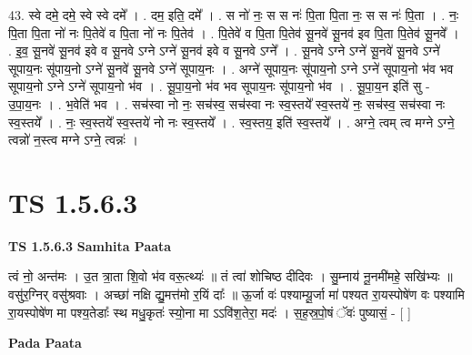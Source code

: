 \documentclass[17pt]{extarticle}
\begin{document}
43. स्वे दमे॒ दमे॒ स्वे स्वे दमे᳚ । . दम॒ इति॒ दमे᳚ । . स नो॑ नः॒ स स नः॑ पि॒ता पि॒ता नः॒ स स नः॑ पि॒ता । . नः॒ पि॒ता पि॒ता नो॑ नः पि॒तेवे॑ व पि॒ता नो॑ नः पि॒तेव॑ । . पि॒तेवे॑ व पि॒ता पि॒तेव॑ सू॒नवे॑ सू॒नव॑ इव पि॒ता पि॒तेव॑ सू॒नवे᳚ । . इ॒व॒ सू॒नवे॑ सू॒नव॑ इवे व सू॒नवे ऽग्ने ऽग्ने॑ सू॒नव॑ इवे व सू॒नवे ऽग्ने᳚ । . सू॒नवे ऽग्ने ऽग्ने॑ सू॒नवे॑ सू॒नवे ऽग्ने॑ सूपाय॒नः सू॑पाय॒नो ऽग्ने॑ सू॒नवे॑ सू॒नवे ऽग्ने॑ सूपाय॒नः । . अग्ने॑ सूपाय॒नः सू॑पाय॒नो ऽग्ने ऽग्ने॑ सूपाय॒नो भ॑व भव सूपाय॒नो ऽग्ने ऽग्ने॑ सूपाय॒नो भ॑व । . सू॒पा॒य॒नो भ॑व भव सूपाय॒नः सू॑पाय॒नो भ॑व । . सू॒पा॒य॒न इति॑ सु - उ॒पा॒य॒नः । . भ॒वेति॑ भव । . सच॑स्वा नो नः॒ सच॑स्व॒ सच॑स्वा नः स्व॒स्तये᳚ स्व॒स्तये॑ नः॒ सच॑स्व॒ सच॑स्वा नः स्व॒स्तये᳚ । . नः॒ स्व॒स्तये᳚ स्व॒स्तये॑ नो नः स्व॒स्तये᳚ । . स्व॒स्तय॒ इति॑ स्व॒स्तये᳚ । . अग्ने॒ त्वम् त्व मग्ने ऽग्ने॒ त्वन्नो॑ न॒स्त्व मग्ने ऽग्ने॒ त्वन्नः॑ । \newline
\pagebreak
{}

\section{ TS 1.5.6.3 }

\textbf{TS 1.5.6.3 } \newline
\textbf{Samhita Paata} \newline

त्वं नो॒ अन्त॑मः । उ॒त त्रा॒ता शि॒वो भ॑व वरू॒त्थ्यः॑ ॥ तं त्वा॑ शोचिष्ठ दीदिवः । सु॒म्नाय॑ नू॒नमी॑महे॒ सखि॑भ्यः ॥ वसु॑र॒ग्निर् वसु॑श्रवाः । अच्छा॑ नक्षि द्यु॒मत्त॑मो र॒यिं दाः᳚ ॥ ऊ॒र्जा वः॑ पश्याम्यू॒र्जा मा॑ पश्यत रा॒यस्पोषे॑ण वः पश्यामि रा॒यस्पोषे॑ण मा पश्य॒तेडाः᳚ स्थ मधु॒कृतः॑ स्यो॒ना मा ऽऽवि॑श॒तेरा॒ मदः॑ । स॒ह॒स्र॒पो॒षं ॅवः॑ पुष्यासं॒ - [ ] \newline

\textbf{Pada Paata} \newline
\end{document}
